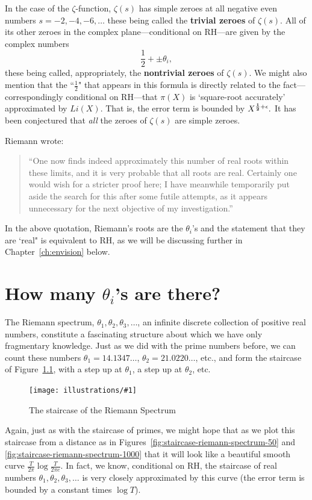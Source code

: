 \documentclass[openany]{book}
\newcommand{\ill}[3]{%
   \begin{figure}[H]%
   \vspace{-2ex}
   \centering%
   \texttt{[image: illustrations/\#1]}%
   \caption{#3}%
   \vspace{-2ex}
    \end{figure}}
\theoremstyle{plain}
\theoremstyle{definition}
\begin{document}
{{In the case of the $\zeta$-function, $\zeta(s)$ has simple zeroes  at all negative even numbers $s=-2,-4,-6,\dots$ these being called the {\bf trivial zeroes} of $\zeta(s)$. All of its other zeroes in the complex plane---conditional on RH---are given by  the complex numbers $${\frac{1}{2}} +\pm\theta_i,$$ these being called, appropriately, the {\bf nontrivial zeroes} of $\zeta(s)$.    We might also mention that the ``${\frac{1}{2}}$" that appears in this formula is directly related to the fact---correspondingly conditional on RH---that $\pi(X)$ is `square-root accurately' approximated by $Li(X)$.  That is, the error term is bounded by $X^{{\bf{\frac{1}{2}}}+\epsilon}.$  It has been conjectured that {\it all} the zeroes of $\zeta(s)$ are simple zeroes.

Riemann wrote:
 \begin{quote}
  ``One now finds indeed approximately this number of real roots
  within these limits, and it is very probable that all roots are
  real. Certainly one would wish for a stricter proof here; I have
  meanwhile temporarily put aside the search for this after some
  futile attempts, as it appears unnecessary for the next objective of
  my investigation.''
\end{quote}

 In the above quotation, Riemann's roots are the $\theta_i$'s and the statement that they are `real" is equivalent to RH, as we will be discussing further in Chapter~\ref{ch:envision} below.

\chapter{ How many $\theta_i$'s are there?}

  The Riemann spectrum, $\theta_1, \theta_2, \theta_3, \dots$, an infinite discrete collection of
positive real numbers, constitute a fascinating structure about which we have only fragmentary knowledge.
Just as we did with the prime numbers before, we can count
these numbers $\theta_1=14.1347\ldots$,
$\theta_2=21.0220\ldots$, etc., and form the staircase
of Figure~\ref{fig:staircase-riemann-spectrum-30},
with a step up at $\theta_1$, a step up at $\theta_2$, etc.

\ill{staircase-riemann-spectrum-30}{0.8}{The staircase of the Riemann Spectrum\label{fig:staircase-riemann-spectrum-30}}

Again, just as with the staircase of primes, we might hope
that as we plot this staircase from a distance as in
Figures~\ref{fig:staircase-riemann-spectrum-50} and \ref{fig:staircase-riemann-spectrum-1000} that it will
look like a beautiful smooth curve ${\frac{T}{2\pi}}\log {\frac{T}{2\pi e}}$.
In fact, we know, conditional on RH, the staircase of real numbers $\theta_1, \theta_2, \theta_3,\dots$ is very closely approximated by this
curve (the error term is bounded by a constant times $\log T$).



}}
\end{document}
